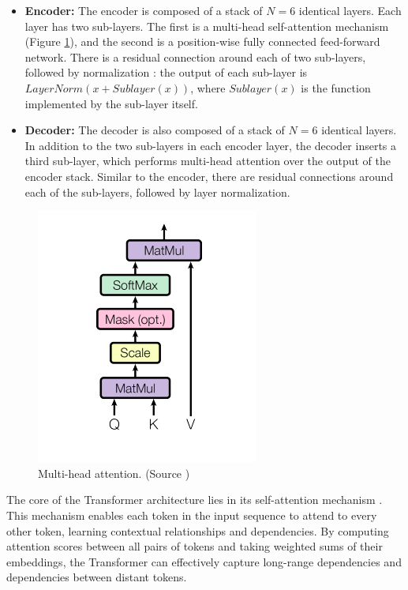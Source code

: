 \begin{itemize}
  \item \textbf{Encoder:} The encoder is composed of a stack of $N=6$ identical layers. Each layer has two
  sub-layers. The first is a multi-head self-attention mechanism (Figure \ref{fig:transformer_multihead}), and the
  second is a position-wise fully
  connected feed-forward network. There is a residual connection \cite{DeepResidual2016} around each of two sub-layers, followed by normalization \cite{ba2016layer}: the output of each sub-layer is $LayerNorm(x + Sublayer(x))$, where $Sublayer(x)$ is the function implemented by the sub-layer
  itself.
  \item \textbf{Decoder:} The decoder is also composed of a stack of $N=6$ identical layers. In addition to the two
  sub-layers in each encoder layer, the decoder inserts a third sub-layer, which performs multi-head
  attention over the output of the encoder stack. Similar to the encoder, there are residual connections
  around each of the sub-layers, followed by layer normalization.
\end{itemize}

\begin{figure}
  \centering
  \includegraphics[width=0.5\linewidth]{text/chapter_03/imgs/multihead}
  \caption{Multi-head attention. (Source \cite{vaswani2023attention})}
  \label{fig:transformer_multihead}
\end{figure}


The core of the Transformer architecture lies in its self-attention mechanism \cite{vaswani2023attention}. This mechanism enables each token in the input sequence to attend to every other token, learning contextual relationships and dependencies. By computing attention scores between all pairs of tokens and taking weighted sums of their embeddings, the Transformer can effectively capture long-range dependencies and dependencies between distant tokens.

